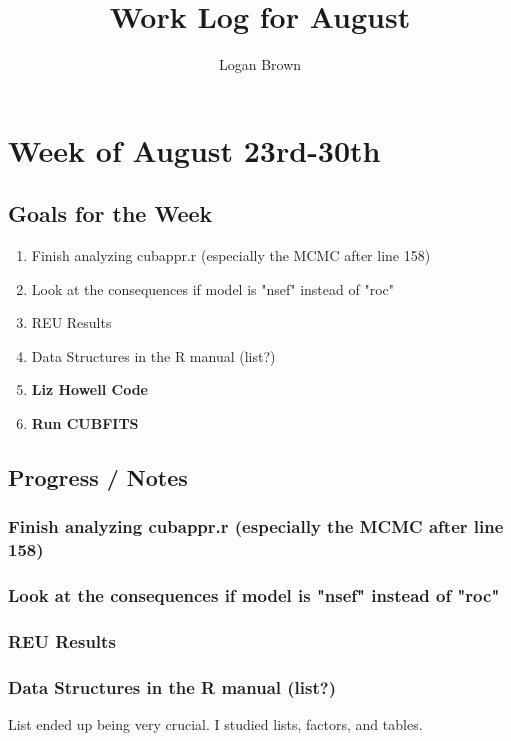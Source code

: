 \documentclass[11pt]{article} %
\title{Work Log for August}
\author{Logan Brown}
\begin{document}
\maketitle


\setcounter{section}{03} %
\setcounter{subsection}{-1}
\setcounter{subsubsection}{0}

\section{Week of August 23rd-30th}
\subsection{Goals for the Week}
\begin{enumerate}
\item Finish analyzing cubappr.r (especially the MCMC after line 158)
\item Look at the consequences if model is "nsef" instead of "roc"
\item REU Results
\item Data Structures in the R manual (list?)
\item \textbf{Liz Howell Code}
\item \textbf{Run CUBFITS}
\end{enumerate}

\subsection{Progress / Notes}

\subsubsection{Finish analyzing cubappr.r (especially the MCMC after line 158)}

\subsubsection{Look at the consequences if model is "nsef" instead of "roc"}

\subsubsection{REU Results}

\subsubsection{Data Structures in the R manual (list?)}
List ended up being very crucial. I studied lists, factors, and tables.
\end{document}
